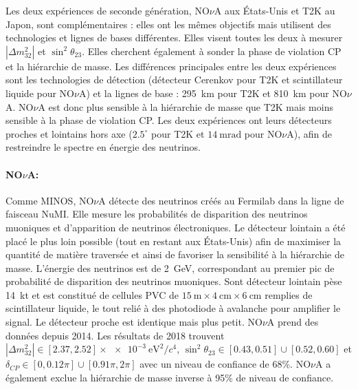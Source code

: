             Les deux expériences de seconde génération, NO$\nu$A aux États-Unis et T2K au Japon, sont complémentaires : elles ont les mêmes objectifs mais utilisent des technologies et lignes de bases différentes.  Elles visent toutes les deux à mesurer $|\Delta m_{32}^2|$ et $\sin^2{\theta_{23}}$. Elles cherchent également à sonder la phase de violation CP et la hiérarchie de masse. Les différences principales entre les deux expériences sont les technologies de détection (détecteur Cerenkov pour T2K et scintillateur liquide pour NO$\nu$A) et la lignes de base : \SI{295}{\kilo\meter} pour T2K et \SI{810}{\kilo\meter} pour NO$\nu$A. NO$\nu$A est donc plus sensible à la hiérarchie de masse que T2K mais moins sensible à la phase de violation CP. Les deux expériences ont leurs détecteurs proches et lointains hors axe ($2.5^{\circ}$ pour T2K et $\SI{14}{\milli\radian}$ pour NO$\nu$A), afin de restreindre le spectre en énergie des neutrinos.
            
            \paragraph{\texorpdfstring{NO$\nu$A}{NOVA}\cite{Acero2018}:} Comme MINOS, NO$\nu$A détecte des neutrinos créés au Fermilab dans la ligne de faisceau NuMI. Elle mesure les probabilités de disparition des neutrinos muoniques et d'apparition de neutrinos électroniques. Le détecteur lointain a été placé le plus loin possible (tout en restant aux États-Unis) afin de maximiser la quantité de matière traversée et ainsi de favoriser la sensibilité à la hiérarchie de masse. L'énergie des neutrinos est de \SI{2}{\giga\electronvolt}, correspondant au premier pic de probabilité de disparition des neutrinos muoniques. Sont détecteur lointain pèse \SI{14}{\kilo\tonne} et est constitué de  cellules PVC de $\SI{15}{\meter}\times\SI{4}{\centi\meter}\times\SI{6}{\centi\meter}$ remplies de scintillateur liquide, le tout relié à des photodiode à avalanche pour amplifier le signal. Le détecteur proche est identique mais plus petit. NO$\nu$A prend des données depuis 2014. Les résultats de 2018\cite{Acero2018} trouvent $|\Delta m_{32}^2|\in[2.37, 2.52]\times\SI{e-3}{\electronvolt\squared\per c^4}$, $\sin^2{\theta_{23}}\in [0.43, 0.51]\cup[0.52, 0.60]$ et $\delta_{CP}\in[0, 0.12\pi]\cup[0.91\pi, 2\pi]$ avec un niveau de confiance de 68\;\%. NO$\nu$A a également exclue la hiérarchie de masse inverse à 95\;\% de niveau de confiance.
            
